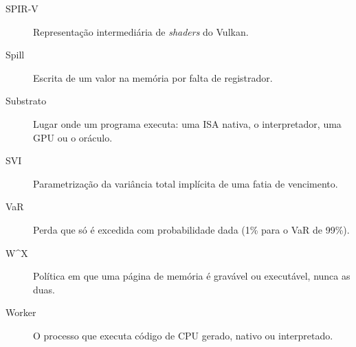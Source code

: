 \begin{description}
  \item[SPIR-V] Representação intermediária de \textit{shaders} do Vulkan.
  \item[Spill] Escrita de um valor na memória por falta de registrador.
  \item[Substrato] Lugar onde um programa executa: uma ISA nativa, o interpretador, uma GPU ou o oráculo.
  \item[SVI] Parametrização da variância total implícita de uma fatia de vencimento.
  \item[VaR] Perda que só é excedida com probabilidade dada (1\% para o VaR de 99\%).
  \item[W\^{}X] Política em que uma página de memória é gravável ou executável, nunca as duas.
  \item[Worker] O processo que executa código de CPU gerado, nativo ou interpretado.
\end{description}
